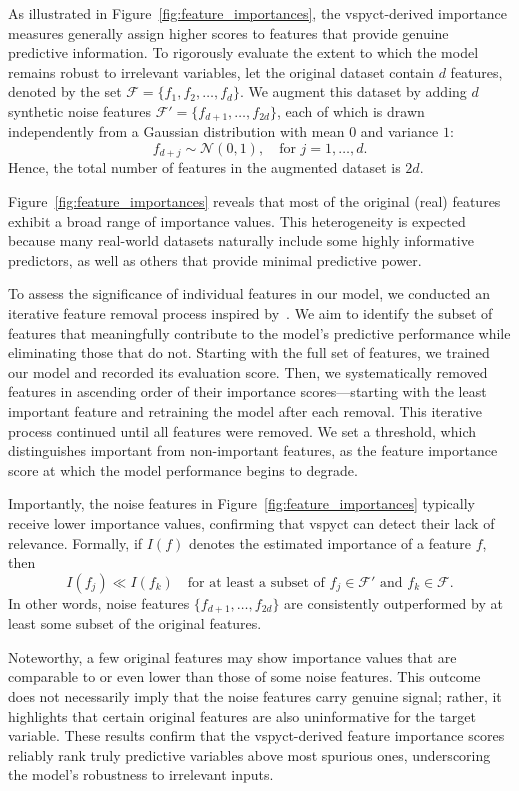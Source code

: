 \documentclass[3p,review,authoryear]{elsarticle}
\begin{document}
As illustrated in Figure~\ref{fig:feature_importances}, the \gls{vspyct}-derived importance measures generally assign higher scores to features that provide genuine predictive information.
To rigorously evaluate the extent to which the model remains robust to irrelevant variables, let the original dataset contain \(d\) features, denoted by the set
\(\mathcal{F} = \{f_1, f_2, \ldots, f_d\}\).
We augment this dataset by adding \(d\) synthetic noise features
\(\mathcal{F}' = \{f_{d+1}, \ldots, f_{2d}\}\),
each of which is drawn independently from a Gaussian distribution with mean \(0\) and variance \(1\):
\[
f_{d + j} \sim \mathcal{N}(0, 1), 
\quad \text{for } j = 1, \ldots, d.
\]
Hence, the total number of features in the augmented dataset is \(2d\).



Figure~\ref{fig:feature_importances} reveals that most of the original (real) features exhibit a broad range of importance values.
This heterogeneity is expected because many real-world datasets naturally include some highly informative predictors, as well as others that provide minimal predictive power.

To assess the significance of individual features in our model, we conducted an iterative feature removal process inspired by~\cite{guyon2003introduction}.
We aim to identify the subset of features that meaningfully contribute to the model’s predictive performance while eliminating those that do not.
Starting with the full set of features, we trained our model and recorded its evaluation score.
Then, we systematically removed features in ascending order of their importance scores—starting with the least important feature and retraining the model after each removal.
This iterative process continued until all features were removed.
We set a threshold, which distinguishes important from non-important features, as the feature importance score at which the model performance begins to degrade.

Importantly, the noise features in Figure~\ref{fig:feature_importances} typically receive lower importance values, confirming that \gls{vspyct} can detect their lack of relevance.
Formally, if \(I(f)\) denotes the estimated importance of a feature \(f\), then
\[
I(f_j) \ll I(f_k)
\quad \text{for at least a subset of } f_j \in \mathcal{F}' \text{ and } f_k \in \mathcal{F}.
\]
In other words, noise features \(\{f_{d+1}, \ldots, f_{2d}\}\) are consistently outperformed by at least some subset of the original features.

Noteworthy, a few original features may show importance values that are comparable to or even lower than those of some noise features. 
This outcome does not necessarily imply that the noise features carry genuine signal; rather, it highlights that certain original features are also uninformative for the target variable.
These results confirm that the \gls{vspyct}-derived feature importance scores reliably rank truly predictive variables above most spurious ones, underscoring the model's robustness to irrelevant inputs.
\end{document}
